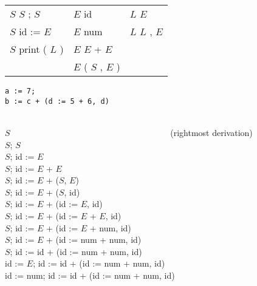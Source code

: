 \begin{slide*}
\begin{tabular}{lll}
$S$ \RA{} $S$ ; $S$ & $E$ \RA{} id & $L$ \RA{} $E$ \\
$S$ \RA{} id := $E$ & $E$ \RA{} num & $L$ \RA{} $L$ , $E$\\
$S$ \RA{} print ( $L$ ) & $E$ \RA{} $E$ + $E$ & \\
 & $E$ \RA{} ( $S$ , $E$ ) &
\end{tabular}
\vspace{-0.05in}
\begin{small}
\begin{tabbing}
{\tt a := 7;}\\
{\tt b := c + (d := 5 + 6, d)}
\end{tabbing}
\end{small}
\begin{small}
\begin{tabbing}
\\
\underline{$S$}~~~~~~~~~~~~~~~~~~~~~~~~~~~~~~~~~~~~~ (rightmost derivation)\\
$S$; \underline{$S$}\\
$S$; id := \underline{$E$}\\
$S$; id := $E$ + \underline{$E$}\\
$S$; id := $E$ + ($S$, \underline{$E$})\\
$S$; id := $E$ + (\underline{$S$}, id)\\
$S$; id := $E$ + (id := \underline{$E$}, id)\\
$S$; id := $E$ + (id := $E$ + \underline{$E$}, id)\\
$S$; id := $E$ + (id := \underline{$E$} + num, id)\\
$S$; id := \underline{$E$} + (id := num + num, id)\\
\underline{$S$}; id := id + (id := num + num, id)\\
id := \underline{$E$}; id := id + (id := num + num, id)\\
id := num; id := id + (id := num + num, id)\\
\end{tabbing}
\end{small}
\vfil
\end{slide*}

